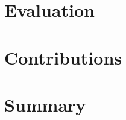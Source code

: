 


% 
% 



\tableofcontents







\chapter{Evaluation}
\chapter{Contributions}
\chapter{Summary}

%
\printbibliography
